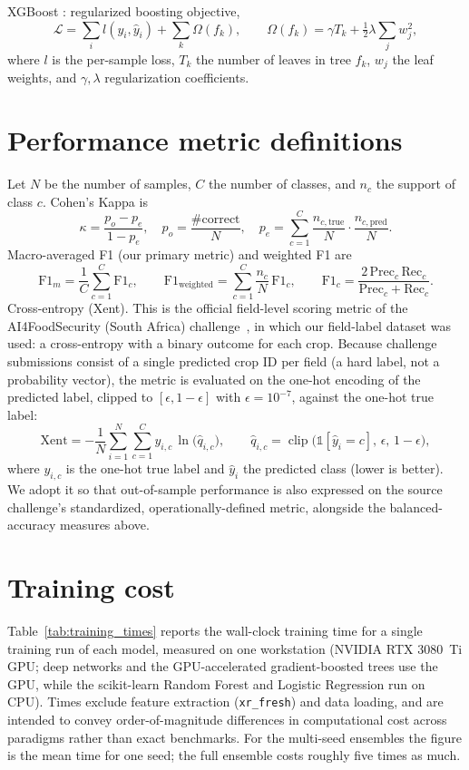 \documentclass[pdflatex,sn-mathphys]{sn-jnl} %
\begin{document}
\noindent XGBoost \cite{chen2016, friedman2001}: regularized boosting objective,
\[
\mathcal{L} = \sum_i l(y_i, \hat{y}_i) + \sum_k \Omega(f_k),
\qquad
\Omega(f_k) = \gamma T_k + \tfrac{1}{2}\lambda \sum_j w_j^2,
\]
where $l$ is the per-sample loss, $T_k$ the number of leaves in tree $f_k$, $w_j$ the
leaf weights, and $\gamma,\lambda$ regularization coefficients.

\section{Performance metric definitions}
\label{app:metrics}

Let $N$ be the number of samples, $C$ the number of classes, and $n_c$ the support of
class $c$. Cohen's Kappa is
\[
\kappa = \frac{p_o - p_e}{1 - p_e},\quad
p_o = \frac{\#\text{correct}}{N},\quad
p_e = \sum_{c=1}^C \frac{n_{c,\text{true}}}{N}\cdot\frac{n_{c,\text{pred}}}{N}.
\]
Macro-averaged F1 (our primary metric) and weighted F1 are
\[
\mathrm{F1}_{m} = \frac{1}{C}\sum_{c=1}^{C} \mathrm{F1}_c,
\qquad
\mathrm{F1}_{\text{weighted}} = \sum_{c=1}^{C}\frac{n_c}{N}\,\mathrm{F1}_c,
\qquad
\mathrm{F1}_c = \frac{2\,\mathrm{Prec}_c\,\mathrm{Rec}_c}{\mathrm{Prec}_c+\mathrm{Rec}_c}.
\]
Cross-entropy (Xent). This is the official field-level scoring metric of the
AI4FoodSecurity (South Africa) challenge~\cite{ai4foodsecurity}, in which our
field-label dataset was used: a cross-entropy with a binary outcome for each crop.
Because challenge submissions consist of a single predicted crop ID per field (a hard
label, not a probability vector), the metric is evaluated on the one-hot encoding of the
predicted label, clipped to $[\epsilon, 1-\epsilon]$ with $\epsilon=10^{-7}$, against the
one-hot true label:
\[
\mathrm{Xent} = -\frac{1}{N}\sum_{i=1}^N \sum_{c=1}^{C} y_{i,c}\,\ln\!\big(\hat{q}_{i,c}\big),
\qquad
\hat{q}_{i,c} = \operatorname{clip}\!\big(\mathbb{1}[\hat{y}_i = c],\,\epsilon,\,1-\epsilon\big),
\]
where $y_{i,c}$ is the one-hot true label and $\hat{y}_i$ the predicted class (lower is
better). We adopt it so that out-of-sample performance is also expressed on the source
challenge's standardized, operationally-defined metric, alongside the balanced-accuracy
measures above.

\section{Training cost}
\label{app:training_times}

Table~\ref{tab:training_times} reports the wall-clock training time for a single
training run of each model, measured on one workstation (NVIDIA RTX 3080~Ti GPU;
deep networks and the GPU-accelerated gradient-boosted trees use the GPU, while the
scikit-learn Random Forest and Logistic Regression run on CPU). Times exclude
feature extraction (\texttt{xr\_fresh}) and data loading, and are intended to convey
order-of-magnitude differences in computational cost across paradigms rather than
exact benchmarks. For the multi-seed ensembles the figure is the mean time for one
seed; the full ensemble costs roughly five times as much.
\end{document}
